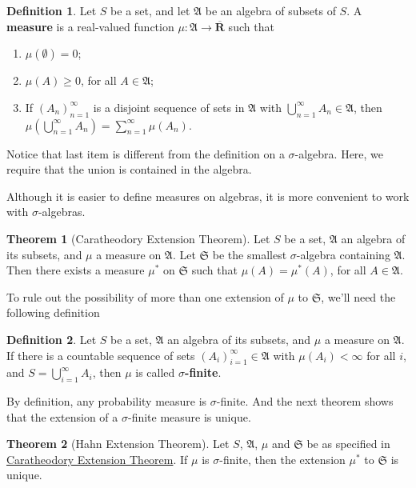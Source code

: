 \documentclass[12pt,a4paper]{article}
\theoremstyle{definition}
\newtheorem{theorem}{Theorem}[section]
\newtheorem{definition}{Definition}[section]
\begin{document}
\begin{definition}
	Let $S$ be a set, and let $\mathfrak{A}$ be an algebra of subsets of $S$. A \textbf{measure} is a real-valued function $\mu : \mathfrak{A} \longrightarrow \overline{\textbf{R}}$ such that 
	\begin{enumerate}
		\item $\mu ( \emptyset ) = 0$;
		\item $\mu(A) \geq 0$, for all $A \in \mathfrak{A}$;
		\item If $(A_n)_{n=1}^\infty$ is a disjoint sequence of sets in $\mathfrak{A}$ with $\bigcup_{n=1}^\infty A_n \in \mathfrak{A}$, then $\mu \left( \bigcup_{n=1}^\infty A_n \right) = \sum_{n=1}^\infty \mu(A_n)$.
	\end{enumerate}
\end{definition}

Notice that last item is different from the definition on a $\sigma$-algebra. Here, we require that the union is contained in the algebra.

Although it is easier to define measures on algebras, it is more convenient to work with $\sigma$-algebras.

\begin{theorem}[Caratheodory Extension Theorem]\label{thm:caratheodory}
	Let $S$ be a set, $\mathfrak{A}$ an algebra of its subsets, and $\mu$ a measure on $\mathfrak{A}$. Let $\mathfrak{S}$ be the smallest $\sigma$-algebra containing $\mathfrak{A}$. Then there exists a measure $\mu^{\ast}$ on $\mathfrak{S}$ such that $\mu(A) = \mu^{\ast}(A)$, for all $A \in \mathfrak{A}$.
\end{theorem}

To rule out the possibility of more than one extension of $\mu$ to $\mathfrak{S}$, we'll need the following definition

\begin{definition}
	Let $S$ be a set, $\mathfrak{A}$ an algebra of its subsets, and $\mu$ a measure on $\mathfrak{A}$. If there is a countable sequence of sets $(A_i)_{i=1}^\infty \in \mathfrak{A}$ with $\mu(A_i) < \infty$ for all $i$, and $S = \bigcup_{i=1}^\infty A_i$, then $\mu$ is called \textbf{$\sigma$-finite}.
\end{definition}

By definition, any probability measure is $\sigma$-finite. And the next theorem shows that the extension of a $\sigma$-finite measure is unique.

\begin{theorem}[Hahn Extension Theorem]
	Let $S$, $\mathfrak{A}$, $\mu$ and $\mathfrak{S}$ be as specified in \hyperref[thm:caratheodory]{Caratheodory Extension Theorem}. If $\mu$ is $\sigma$-finite, then the extension $\mu^{\ast}$ to $\mathfrak{S}$ is unique.
\end{theorem}
\end{document}
